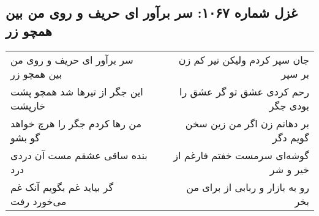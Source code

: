 \begin{center}
\section*{غزل شماره ۱۰۶۷: سر برآور ای حریف و روی من بین همچو زر}
\label{sec:1067}
\begin{longtable}{l p{0.5cm} r}
سر برآور ای حریف و روی من بین همچو زر
&&
جان سپر کردم ولیکن تیر کم زن بر سپر
\\
این جگر از تیرها شد همچو پشت خارپشت
&&
رحم کردی عشق تو گر عشق را بودی جگر
\\
من رها کردم جگر را هرچ خواهد گو بشو
&&
بر دهانم زن اگر من زین سخن گویم دگر
\\
بنده ساقی عشقم مست آن دردی درد
&&
گوشه‌ای سرمست خفتم فارغم از خیر و شر
\\
گر بیاید غم بگویم آنک غم می‌خورد رفت
&&
رو به بازار و ربابی از برای من بخر
\\
\end{longtable}
\end{center}
